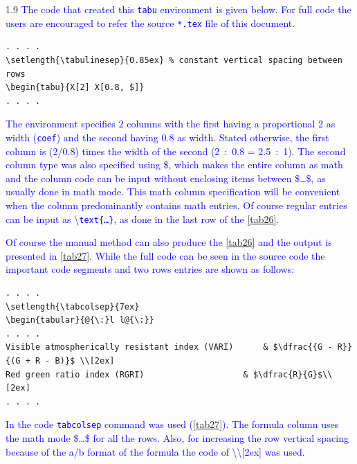 \documentclass[phd]{ndsu-thesis-2022}
\newcommand\myspacing{1.9}      %
\newcommand\italk[1]{\textcolor{blue}{#1}}  %
\newcommand\cmd[1]{\textbackslash\texttt{#1}}  %
\newcommand\vb[1]{\textcolor{blue}{\texttt{#1}}}%
\begin{document}
\begin{spacing}{\myspacing}
\italk{The code that created this \vb{tabu} environment is given below. For full code the users are encouraged to refer the source \vb{*.tex} file of this document.}

\vspace{-1ex}
{\singlespacing
\begin{verbatim}
. . . . 
\setlength{\tabulinesep}{0.85ex} % constant vertical spacing between rows
\begin{tabu}{X[2] X[0.8, $]}
. . . . 
\end{verbatim}
}

\vspace{-2ex}
\italk{The environment specifies 2 columns with the first having a proportional 2 as width (\vb{coef}) and the second having 0.8 as width. Stated otherwise, the first column is \fpeval{2/0.8} (2/0.8) times the width of the second (2~:~0.8 = 2.5~:~1). The second column type was also specified using \$, which makes the entire column as math and the column code can be input without enclosing items between \$\ldots\$, as usually done in math mode. This math column specification will be convenient when the column predominantly contains math entries. Of course regular entries can be input as \cmd{text\{\ldots\}}, as done in the last row of the \cref{tab26}.
}

\italk{Of course the manual method can also produce the \cref{tab26} and the output is presented in \cref{tab27}.  While the full code can be seen in the source code the important code segments and two rows entries are shown as follows:
}

{\singlespacing
\begin{verbatim}
. . . . 
\setlength{\tabcolsep}{7ex}
\begin{tabular}{@{\:}l l@{\:}}
. . . . 
Visible atmospherically resistant index (VARI) 		& $\dfrac{{G - R}}
{(G + R - B)}$ \\[2ex]
Red green ratio index (RGRI) 					& $\dfrac{R}{G}$\\[2ex]
. . . . 
\end{verbatim}
}

\vspace{-2ex}
\italk{In the code \vb{tabcolsep} command was used (\cref{tab27}). The formula column uses the math mode \$\ldots\$ for all the rows. Also, for increasing the row vertical spacing because of the a/b format of the formula the code of \textbackslash\textbackslash[2ex] was used.}


\end{spacing}
\end{document}
